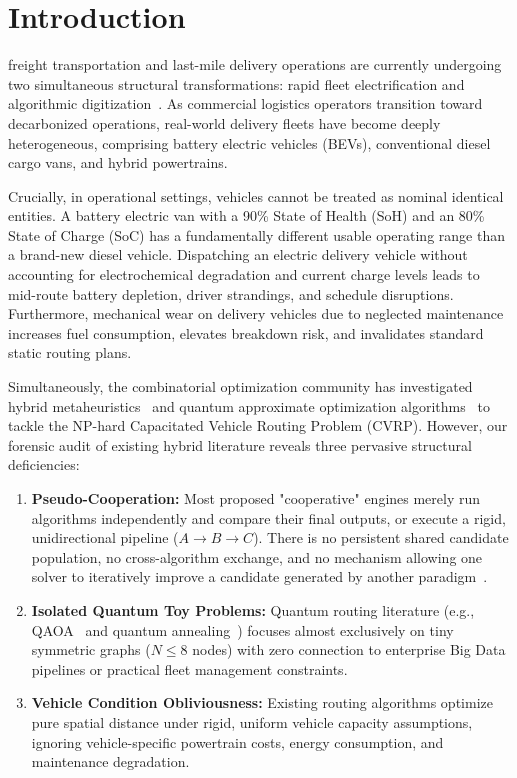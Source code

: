\section{Introduction}
 freight transportation and last-mile delivery operations are currently undergoing two simultaneous structural transformations: rapid fleet electrification and algorithmic digitization~\cite{toth2014vehicle}. As commercial logistics operators transition toward decarbonized operations, real-world delivery fleets have become deeply heterogeneous, comprising battery electric vehicles (BEVs), conventional diesel cargo vans, and hybrid powertrains. 

Crucially, in operational settings, vehicles cannot be treated as nominal identical entities. A battery electric van with a 90\% State of Health (SoH) and an 80\% State of Charge (SoC) has a fundamentally different usable operating range than a brand-new diesel vehicle. Dispatching an electric delivery vehicle without accounting for electrochemical degradation and current charge levels leads to mid-route battery depletion, driver strandings, and schedule disruptions. Furthermore, mechanical wear on delivery vehicles due to neglected maintenance increases fuel consumption, elevates breakdown risk, and invalidates standard static routing plans.

Simultaneously, the combinatorial optimization community has investigated hybrid metaheuristics~\cite{burke2013hyper,talbi2009metaheuristics} and quantum approximate optimization algorithms~\cite{farhi2014qaoa,hadfield2019qaoa,feld2019hybrid} to tackle the NP-hard Capacitated Vehicle Routing Problem (CVRP). However, our forensic audit of existing hybrid literature reveals three pervasive structural deficiencies:
\begin{enumerate}
    \item \textbf{Pseudo-Cooperation:} Most proposed "cooperative" engines merely run algorithms independently and compare their final outputs, or execute a rigid, unidirectional pipeline ($A \to B \to C$). There is no persistent shared candidate population, no cross-algorithm exchange, and no mechanism allowing one solver to iteratively improve a candidate generated by another paradigm~\cite{toulouse2004cooperative}.
    \item \textbf{Isolated Quantum Toy Problems:} Quantum routing literature (e.g., QAOA~\cite{azad2022solving} and quantum annealing~\cite{feld2019hybrid}) focuses almost exclusively on tiny symmetric graphs ($N \le 8$ nodes) with zero connection to enterprise Big Data pipelines or practical fleet management constraints.
    \item \textbf{Vehicle Condition Obliviousness:} Existing routing algorithms optimize pure spatial distance under rigid, uniform vehicle capacity assumptions, ignoring vehicle-specific powertrain costs, energy consumption, and maintenance degradation.
\end{enumerate}

